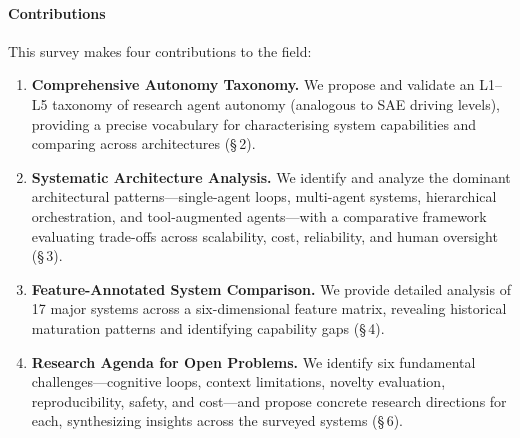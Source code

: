 %
%
%

\paragraph*{Contributions}
This survey makes four contributions to the field:

\begin{enumerate}
  \item \textbf{Comprehensive Autonomy Taxonomy.} We propose and
    validate an L1--L5 taxonomy of research agent autonomy
    (analogous to SAE driving levels), providing a precise
    vocabulary for characterising system capabilities and comparing
    across architectures (\S\,2).

  \item \textbf{Systematic Architecture Analysis.} We identify and
    analyze the dominant architectural patterns---single-agent
    loops, multi-agent systems, hierarchical orchestration, and
    tool-augmented agents---with a comparative framework evaluating
    trade-offs across scalability, cost, reliability, and human
    oversight (\S\,3).

  \item \textbf{Feature-Annotated System Comparison.} We provide
    detailed analysis of 17 major systems across a six-dimensional
    feature matrix, revealing historical maturation patterns and
    identifying capability gaps (\S\,4).

  \item \textbf{Research Agenda for Open Problems.} We identify six
    fundamental challenges---cognitive loops, context limitations,
    novelty evaluation, reproducibility, safety, and cost---and
    propose concrete research directions for each, synthesizing
    insights across the surveyed systems (\S\,6).
\end{enumerate}

